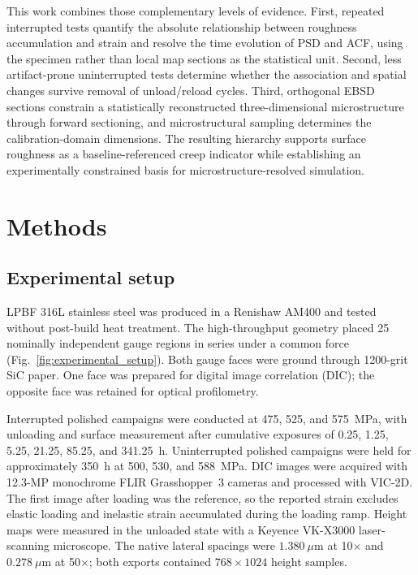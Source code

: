 \documentclass[final,12pt]{cas-sc}
\begin{document}
This work combines those complementary levels of evidence. First, repeated interrupted tests quantify the absolute relationship between roughness accumulation and strain and resolve the time evolution of PSD and ACF, using the specimen rather than local map sections as the statistical unit. Second, less artifact-prone uninterrupted tests determine whether the association and spatial changes survive removal of unload/reload cycles. Third, orthogonal EBSD sections constrain a statistically reconstructed three-dimensional microstructure through forward sectioning, and microstructural sampling determines the calibration-domain dimensions. The resulting hierarchy supports surface roughness as a baseline-referenced creep indicator while establishing an experimentally constrained basis for microstructure-resolved simulation.


\section{Methods}

\subsection{Experimental setup}

LPBF 316L stainless steel was produced in a Renishaw AM400 and tested without
post-build heat treatment. The high-throughput geometry placed 25 nominally
independent gauge regions in series under a common force
(Fig.~\ref{fig:experimental_setup}). Both gauge faces were ground through
1200-grit SiC paper. One face was prepared for digital image correlation
(DIC); the opposite face was retained for optical profilometry.

Interrupted polished campaigns were conducted at 475, 525, and 575~MPa, with
unloading and surface measurement after cumulative exposures of 0.25, 1.25,
5.25, 21.25, 85.25, and 341.25~h. Uninterrupted polished campaigns were held
for approximately 350~h at 500, 530, and 588~MPa. DIC images were acquired
with 12.3-MP monochrome FLIR Grasshopper~3 cameras and processed with VIC-2D.
The first image after loading was the reference, so the reported strain
excludes elastic loading and inelastic strain accumulated during the loading
ramp. Height maps were measured in the unloaded state with a Keyence VK-X3000
laser-scanning microscope. The native lateral spacings were
$1.380~\mu$m at 10$\times$ and $0.278~\mu$m at 50$\times$; both
exports contained $768\times1024$ height samples.
\end{document}
